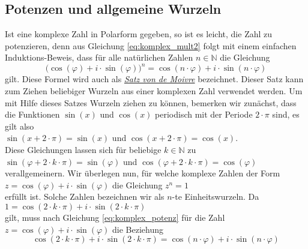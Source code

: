 \subsection{Potenzen und allgemeine Wurzeln}
Ist eine komplexe Zahl in Polarform gegeben, so ist es leicht, die Zahl zu
potenzieren, denn aus Gleichung \ref{eq:komplex_mult2} folgt mit einem einfachen Induktions-Beweis,
dass f\"{u}r alle nat\"{u}rlichen Zahlen $n \in \mathbb{N}$ die Gleichung
\begin{equation}
  \label{eq:komplex_potenz}
  \bigl(\cos(\varphi) + i \cdot \sin(\varphi)\bigr)^n = \cos(n \cdot \varphi) + i \cdot \sin(n \cdot \varphi)
\end{equation}
gilt.  Diese Formel wird auch als \href{http://de.wikipedia.org/wiki/Abraham_de_Moivre}{\emph{Satz von de Moivre}} bezeichnet.  
Dieser Satz kann zum Ziehen beliebiger Wurzeln aus einer komplexen Zahl verwendet werden.  Um mit Hilfe dieses Satzes Wurzeln ziehen
zu k\"{o}nnen, bemerken wir zun\"{a}chst, dass die Funktionen $\sin(x)$ und $\cos(x)$ periodisch mit der Periode
$2 \cdot \pi$ sind, es gilt also
\\[0.2cm]
\hspace*{1.3cm}
$\sin(x + 2 \cdot \pi) = \sin(x)$ \quad und \quad
$\cos(x + 2 \cdot \pi) = \cos(x)$.
\\[0.2cm]
Diese Gleichungen lassen sich f\"{u}r beliebige $k \in \mathbb{N}$ zu
\\[0.2cm]
\hspace*{1.3cm}
$\sin(\varphi + 2 \cdot k \cdot \pi) = \sin(\varphi)$ \quad und \quad
$\cos(\varphi + 2 \cdot k \cdot \pi) = \cos(\varphi)$
\\[0.2cm]
verallgemeinern.  Wir \"{u}berlegen nun, f\"{u}r welche komplexe Zahlen der Form
\\[0.2cm]
\hspace*{1.3cm}
$z = \cos(\varphi) + i \cdot \sin(\varphi)$ \quad die Gleichung \quad $z^n = 1$
\\[0.2cm]
erf\"{u}llt ist.  Solche Zahlen bezeichnen wir als $n$-te Einheitswurzeln.  Da 
\\[0.2cm]
\hspace*{1.3cm}
$1 = \cos(2 \cdot k \cdot \pi) + i \cdot \sin(2 \cdot k \cdot \pi)$
\\[0.2cm]
gilt, muss nach Gleichung \ref{eq:komplex_potenz} f\"{u}r die Zahl $z = \cos(\varphi) + i \cdot \sin(\varphi)$
die Beziehung
\begin{equation}
  \label{eq:komplex_wurzel0}
\cos(2 \cdot k \cdot \pi) + i \cdot \sin(2 \cdot k \cdot \pi) =
\cos(n \cdot \varphi) + i \cdot \sin(n \cdot \varphi)  
\end{equation}
